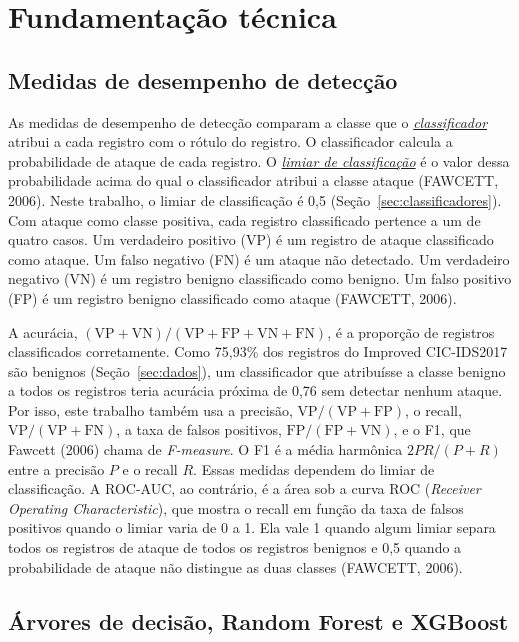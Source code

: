 \documentclass[
  12pt,
  oneside,
  a4paper,
  chapter=TITLE,
  sumario=tradicional,
  english,
  brazil
]{abntex2}
\newcommand{\termo}[2]{\hyperref[gl:#1]{\emph{#2}}}
\begin{document}
\chapter{Fundamentação técnica}
\label{cap:fundamentacao}

\section{Medidas de desempenho de detecção}
\label{sec:medidas-deteccao}

As medidas de desempenho de detecção comparam a classe que o
\termo{classificador}{classificador} atribui a cada registro com o rótulo do registro. O
classificador calcula a probabilidade de ataque de cada registro. O
\termo{limiar-classificacao}{limiar de classificação} é o valor dessa probabilidade acima do qual o
classificador atribui a classe ataque (FAWCETT, 2006). Neste trabalho, o limiar de classificação é
0,5 (Seção~\ref{sec:classificadores}). Com ataque como classe positiva, cada registro classificado
pertence a um de quatro casos. Um verdadeiro positivo (VP) é um registro de ataque classificado como
ataque. Um falso negativo (FN) é um ataque não detectado. Um verdadeiro negativo (VN) é um registro
benigno classificado como benigno. Um falso positivo (FP) é um registro benigno classificado como
ataque (FAWCETT, 2006).

A acurácia, $(\mathrm{VP}+\mathrm{VN})/(\mathrm{VP}+\mathrm{FP}+\mathrm{VN}+\mathrm{FN})$, é a
proporção de registros classificados corretamente. Como 75,93\% dos registros do Improved
CIC-IDS2017 são benignos (Seção~\ref{sec:dados}), um classificador que atribuísse a classe benigno a
todos os registros teria acurácia próxima de 0,76 sem detectar nenhum ataque. Por isso, este
trabalho também usa a precisão, $\mathrm{VP}/(\mathrm{VP}+\mathrm{FP})$, o recall,
$\mathrm{VP}/(\mathrm{VP}+\mathrm{FN})$, a taxa de falsos positivos,
$\mathrm{FP}/(\mathrm{FP}+\mathrm{VN})$, e o F1, que Fawcett (2006) chama de \emph{F-measure}. O F1
é a média harmônica $2PR/(P+R)$ entre a precisão $P$ e o recall $R$. Essas medidas dependem do
limiar de classificação. A ROC-AUC, ao contrário, é a área sob a curva ROC (\emph{Receiver Operating
Characteristic}), que mostra o recall em função da taxa de falsos positivos quando o limiar varia de
0 a 1. Ela vale 1 quando algum limiar separa todos os registros de ataque de todos os registros
benignos e 0,5 quando a probabilidade de ataque não distingue as duas classes (FAWCETT, 2006).

\section{Árvores de decisão, Random Forest e XGBoost}
\label{sec:arvores}
\end{document}
